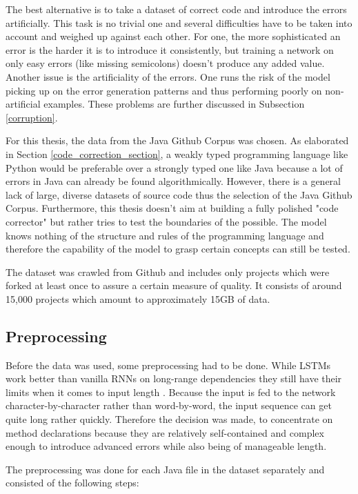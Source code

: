 The best alternative is to take a dataset of correct code and introduce the errors artificially. This task is no trivial one and several difficulties have to be taken into account and weighed up against each other. For one, the more sophisticated an error is the harder it is to introduce it consistently, but training a network on only easy errors (like missing semicolons) doesn't produce any added value. Another issue is the artificiality of the errors. One runs the risk of the model picking up on the error generation patterns and thus performing poorly on non-artificial examples. These problems are further discussed in Subsection \ref{corruption}.

For this thesis, the data from the Java Github Corpus \cite{java_dataset} was chosen. As elaborated in Section \ref{code_correction_section}, a weakly typed programming language like Python would be preferable over a strongly typed one like Java because a lot of errors in Java can already be found algorithmically. However, there is a general lack of large, diverse datasets of source code thus the selection of the Java Github Corpus. Furthermore, this thesis doesn't aim at building a fully polished "code corrector" but rather tries to test the boundaries of the possible. The model knows nothing of the structure and rules of the programming language and therefore the capability of the model to grasp certain concepts can still be tested.

The dataset was crawled from Github and includes only projects which were forked at least once to assure a certain measure of quality. It consists of around 15,000 projects which amount to approximately 15GB of data.

\subsection{Preprocessing}

Before the data was used, some preprocessing had to be done. While LSTMs work better than vanilla RNNs on long-range dependencies they still have their limits when it comes to input length \cite{timestep_limitation}. Because the input is fed to the network character-by-character rather than word-by-word, the input sequence can get quite long rather quickly. Therefore the decision was made, to concentrate on method declarations because they are relatively self-contained and complex enough to introduce advanced errors while also being of manageable length.

The preprocessing was done for each Java file in the dataset separately and consisted of the following steps:

